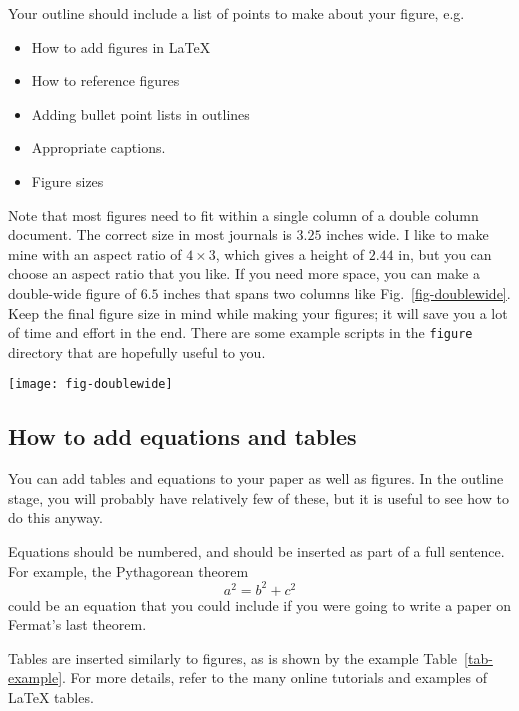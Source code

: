 \documentclass[journal=mamobx, layout=twocolumn]{achemso}
\begin{document}
Your outline should include a list of points to make about your figure, e.g.\
\begin{itemize}
  \item How to add figures in LaTeX
  \item How to reference figures
  \item Adding bullet point lists in outlines
  \item Appropriate captions.
  \item Figure sizes
\end{itemize}

Note that most figures need to fit within a single column of a double column document.
The correct size in most journals is $3.25$ inches wide.
I like to make mine with an aspect ratio of $4\times3$, which gives a height of $2.44$ in, but you can choose an aspect ratio that you like.
If you need more space, you can make a double-wide figure of $6.5$ inches that spans two columns like Fig.~\ref{fig-doublewide}.
Keep the final figure size in mind while making your figures; it will save you a lot of time and effort in the end.
There are some example scripts in the \texttt{figure} directory that are hopefully useful to you.

\begin{figure*}[tbp]
  \texttt{[image: fig-doublewide]}
  \caption{This is a doublewide figure (spans both columns).}
  \label{fig-doublewide}
\end{figure*}

\subsection{How to add equations and tables}

You can add tables and equations to your paper as well as figures.
In the outline stage, you will probably have relatively few of these, but it is useful to see how to do this anyway.

Equations should be numbered, and should be inserted as part of a full sentence.
For example, the Pythagorean theorem
\begin{equation}
a^{2} = b^{2} + c^{2}
\end{equation}
could be an equation that you could include if you were going to write a paper on Fermat's last theorem.

Tables are inserted similarly to figures, as is shown by the example Table~\ref{tab-example}.
For more details, refer to the many online tutorials and examples of LaTeX tables.
\end{document}
